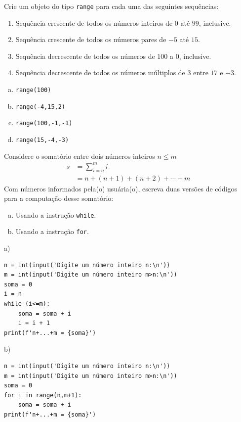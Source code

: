 \begin{exer}
  Crie um objeto do tipo \lstinline+range+ para cada uma das seguintes sequências:
  \begin{enumerate}
  \item Sequência crescente de todos os números inteiros de $0$ até $99$, inclusive.
  \item Sequência crescente de todos os números pares de $-5$ até $15$.
  \item Sequência decrescente de todos os números de $100$ a $0$, inclusive.
  \item Sequência decrescente de todos os números múltiplos de $3$ entre $17$ e $-3$.
  \end{enumerate}
\end{exer}
\begin{resp}
  \begin{enumerate}[a)]
  \item \lstinline+range(100)+
  \item \lstinline+range(-4,15,2)+
  \item \lstinline+range(100,-1,-1)+
  \item \lstinline+range(15,-4,-3)+
  \end{enumerate}
\end{resp}

\begin{exer}
  Considere o somatório entre dois números inteiros $n \leq m$
  \begin{align}
    s &= \sum_{i=n}^m i\\
      &= n + (n+1) + (n+2) + \cdots + m
  \end{align}
  Com números informados pela(o) usuária(o), escreva duas versões de códigos para a computação desse somatório:
  \begin{enumerate}[a)]
  \item Usando a instrução \lstinline+while+.
  \item Usando a instrução \lstinline+for+.
  \end{enumerate}
\end{exer}
\begin{resp}
a)

\begin{lstlisting}
n = int(input('Digite um número inteiro n:\n'))
m = int(input('Digite um número inteiro m>n:\n'))
soma = 0
i = n
while (i<=m):
    soma = soma + i
    i = i + 1
print(f'n+...+m = {soma}')
\end{lstlisting}

b)

\begin{lstlisting}
n = int(input('Digite um número inteiro n:\n'))
m = int(input('Digite um número inteiro m>n:\n'))
soma = 0
for i in range(n,m+1):
    soma = soma + i
print(f'n+...+m = {soma}')
\end{lstlisting}

\end{resp}

